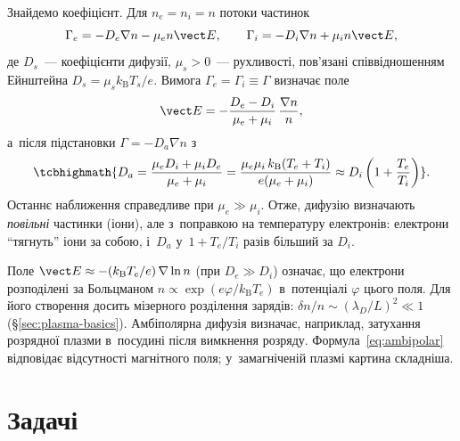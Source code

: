 Знайдемо коефіцієнт. Для $n_e=n_i=n$ потоки частинок
\begin{equation*}
	\Gamma_e=-D_e\nabla n-\mu_en\vect E,\qquad
	\Gamma_i=-D_i\nabla n+\mu_in\vect E,
\end{equation*}
де $D_s$~--- коефіцієнти дифузії, $\mu_s>0$~--- рухливості, пов'язані співвідношенням
Ейнштейна $D_s=\mu_sk_{\mathrm B}T_s/e$. Вимога $\Gamma_e=\Gamma_i\equiv\Gamma$ визначає
поле
\begin{equation*}
	\vect E=-\frac{D_e-D_i}{\mu_e+\mu_i}\,\frac{\nabla n}n,
\end{equation*}
а~після підстановки $\Gamma=-D_a\nabla n$ з~
\begin{equation}\label{eq:ambipolar}
	\tcbhighmath{D_a=\frac{\mu_eD_i+\mu_iD_e}{\mu_e+\mu_i}=\frac{\mu_e\mu_i\,k_{\mathrm B}(T_e+T_i)}{e(\mu_e+\mu_i)}\approx D_i\left(1+\frac{T_e}{T_i}\right)}.
\end{equation}
Останнє наближення справедливе при $\mu_e\gg\mu_i$. Отже, дифузію визначають
\emph{повільні} частинки (іони), але з~поправкою на температуру електронів: електрони
\enquote{тягнуть} іони за собою, і~$D_a$ у~$1+T_e/T_i$ разів більший за $D_i$.

Поле $\vect E\approx-(k_{\mathrm B}T_e/e)\,\nabla\ln n$ (при $D_e\gg D_i$) означає, що
електрони розподілені за Больцманом $n\propto\exp(e\varphi/k_{\mathrm B}T_e)$ в~потенціалі
$\varphi$ цього поля. Для його створення досить мізерного розділення зарядів: $\delta
n/n\sim(\lambda_D/L)^2\ll1$ (§\ref{sec:plasma-basics}). Амбіполярна дифузія визначає,
наприклад, затухання розрядної плазми в~посудині після вимкнення розряду.
Формула~\eqref{eq:ambipolar} відповідає відсутності магнітного поля; у~замагніченій плазмі
картина складніша.





\section*{Задачі}

